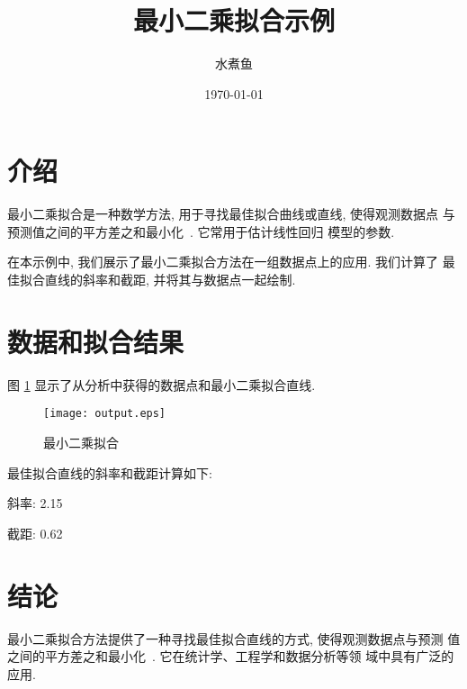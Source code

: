 \documentclass[a4paper]{article}
\begin{document}
\title{最小二乘拟合示例}
\author{水煮鱼}
\date{\today}
\maketitle

\section{介绍}

最小二乘拟合是一种数学方法, 用于寻找最佳拟合曲线或直线, 使得观测数据点
与预测值之间的平方差之和最小化~\cite{ref1,ref2}. 它常用于估计线性回归
模型的参数.

在本示例中, 我们展示了最小二乘拟合方法在一组数据点上的应用. 我们计算了
最佳拟合直线的斜率和截距, 并将其与数据点一起绘制.

\section{数据和拟合结果}

图 \ref{fig:fitting} 显示了从分析中获得的数据点和最小二乘拟合直线.

\begin{figure}[htbp]
    \centering
    \texttt{[image: output.eps]}
    \caption{最小二乘拟合}
    \label{fig:fitting}
\end{figure}

最佳拟合直线的斜率和截距计算如下:

\noindent 斜率: 2.15

\noindent 截距: 0.62

\section{结论}

最小二乘拟合方法提供了一种寻找最佳拟合直线的方式, 使得观测数据点与预测
值之间的平方差之和最小化~\cite{ref1}. 它在统计学、工程学和数据分析等领
域中具有广泛的应用.



\end{document}
